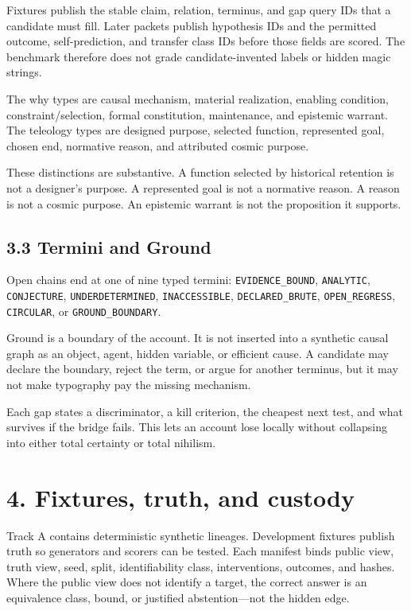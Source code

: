 \documentclass[
  english,
]{article}
\begin{document}
Fixtures publish the stable claim, relation, terminus, and gap query IDs
that a candidate must fill. Later packets publish hypothesis IDs and the
permitted outcome, self-prediction, and transfer class IDs before those
fields are scored. The benchmark therefore does not grade
candidate-invented labels or hidden magic strings.

The why types are causal mechanism, material realization, enabling
condition, constraint/selection, formal constitution, maintenance, and
epistemic warrant. The teleology types are designed purpose, selected
function, represented goal, chosen end, normative reason, and attributed
cosmic purpose.

These distinctions are substantive. A function selected by historical
retention is not a designer's purpose. A represented goal is not a
normative reason. A reason is not a cosmic purpose. An epistemic warrant
is not the proposition it supports.

\subsection{3.3 Termini and Ground}\label{termini-and-ground}

Open chains end at one of nine typed termini: \texttt{EVIDENCE\_BOUND},
\texttt{ANALYTIC}, \texttt{CONJECTURE}, \texttt{UNDERDETERMINED},
\texttt{INACCESSIBLE}, \texttt{DECLARED\_BRUTE}, \texttt{OPEN\_REGRESS},
\texttt{CIRCULAR}, or \texttt{GROUND\_BOUNDARY}.

Ground is a boundary of the account. It is not inserted into a synthetic
causal graph as an object, agent, hidden variable, or efficient cause. A
candidate may declare the boundary, reject the term, or argue for
another terminus, but it may not make typography pay the missing
mechanism.

Each gap states a discriminator, a kill criterion, the cheapest next
test, and what survives if the bridge fails. This lets an account lose
locally without collapsing into either total certainty or total
nihilism.

\section{4. Fixtures, truth, and
custody}\label{fixtures-truth-and-custody}

Track A contains deterministic synthetic lineages. Development fixtures
publish truth so generators and scorers can be tested. Each manifest
binds public view, truth view, seed, split, identifiability class,
interventions, outcomes, and hashes. Where the public view does not
identify a target, the correct answer is an equivalence class, bound, or
justified abstention---not the hidden edge.
\end{document}

